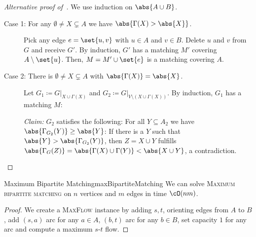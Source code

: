 \documentclass[language=english,algolist,acrolist]{TemplateLecture}
\begin{document}
\begin{proof}[Alternative proof of~]
    We use induction on $\abs{A \cup B}$.
    \begin{description}
        \item[Case 1: For any $\emptyset \neq X \subsetneq A$ we have $\abs{\Gamma(X) > \abs{X}}$.] Pick any edge $e = \set{u,v}$ with $u \in A$ and $v \in B$. Delete $u$ and $v$ from $G$ and receive $G'$. By induction, $G'$ has a matching $M'$ covering $A \setminus \set{u}$. Then, $M = M' \cup \set{e}$ is a matching covering $A$.
        \item[Case 2: There is $\emptyset \neq X \subsetneq A$ with $\abs{\Gamma(X)} = \abs{X}$.] Let $G_1 \coloneqq G|_{X \cup \Gamma(X)}$ and $G_2 \coloneqq G|_{V \setminus (X \cup \Gamma(X))}$. By induction, $G_1$ has a matching $M$:
        
        \emph{Claim:} $G_2$ satisfies the following: For all $Y \subseteq A_2$ we have $\abs{\Gamma_{G_2}(Y)} \geq \abs{Y}$: If there is a $Y$ such that $\abs{Y} > \abs{\Gamma_{G_2}(Y)}$, then $Z = X \cup Y$ fulfills $\abs{\Gamma_G(Z)} = \abs{\Gamma(X) \cup \Gamma(Y)} < \abs{X \cup Y}$, a contradiction.
    \end{description}
\end{proof}

\begin{thm}{Maximum Bipartite Matching}{maxBipartiteMatching}
    We can solve \textsc{Maximum bipartite matching} on $n$ vertices and $m$ edges in time $\cO(nm)$.
\end{thm}

\begin{proof}
    We create a \textsc{MaxFlow} instance by adding $s, t$, orienting edges from $A$ to $B$, add $(s, a)$ arc for any $a \in A$, $(b, t)$ arc for any $b \in B$, set capacity $1$ for any arc and compute a maximum $s$-$t$ flow.
\end{proof}



\end{document}
